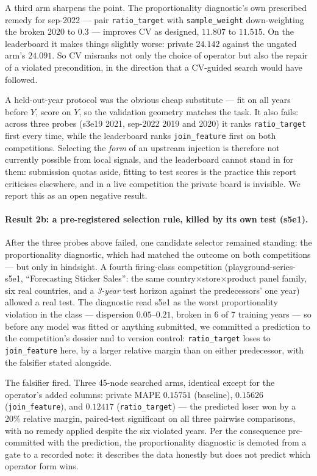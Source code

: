 \documentclass[11pt,a4paper]{article}
\begin{document}
A third arm sharpens the point. The proportionality diagnostic's own prescribed remedy for sep-2022 --- pair \texttt{ratio\_target} with \texttt{sample\_weight} down-weighting the broken 2020 to $0.3$ --- improves CV as designed, $11.807$ to $11.515$. On the leaderboard it makes things slightly worse: private $24.142$ against the ungated arm's $24.091$. So CV misranks not only the choice of operator but also the repair of a violated precondition, in the direction that a CV-guided search would have followed.

A held-out-year protocol was the obvious cheap substitute --- fit on all years before $Y$, score on $Y$, so the validation geometry matches the task. It also fails: across three probes (s3e19 2021, sep-2022 2019 and 2020) it ranks \texttt{ratio\_target} first every time, while the leaderboard ranks \texttt{join\_feature} first on both competitions. Selecting the \emph{form} of an upstream injection is therefore not currently possible from local signals, and the leaderboard cannot stand in for them: submission quotas aside, fitting to test scores is the practice this report criticises elsewhere, and in a live competition the private board is invisible. We report this as an open negative result.

\paragraph{Result 2b: a pre-registered selection rule, killed by its own test (s5e1).} After
the three probes above failed, one candidate selector remained standing: the proportionality
diagnostic, which had matched the outcome on both competitions --- but only in hindsight. A
fourth firing-class competition (playground-series-s5e1, ``Forecasting Sticker Sales'': the
same country$\times$store$\times$product panel family, six real countries, and a \emph{3-year}
test horizon against the predecessors' one year) allowed a real test. The diagnostic read s5e1
as the worst proportionality violation in the class --- dispersion $0.05$--$0.21$, broken in 6
of 7 training years --- so before any model was fitted or anything submitted, we committed a
prediction to the competition's dossier and to version control: \texttt{ratio\_target} loses to
\texttt{join\_feature} here, by a larger relative margin than on either predecessor, with the
falsifier stated alongside.

The falsifier fired. Three 45-node searched arms, identical except for the operator's added
columns: private MAPE $0.15751$ (baseline), $0.15626$ (\texttt{join\_feature}), and
$\mathbf{0.12417}$ (\texttt{ratio\_target}) --- the predicted loser won by a 20\% relative
margin, paired-test significant on all three pairwise comparisons, with no remedy applied
despite the six violated years. Per the consequence pre-committed with the prediction, the
proportionality diagnostic is demoted from a gate to a recorded note: it describes the data
honestly but does not predict which operator form wins.
\end{document}
